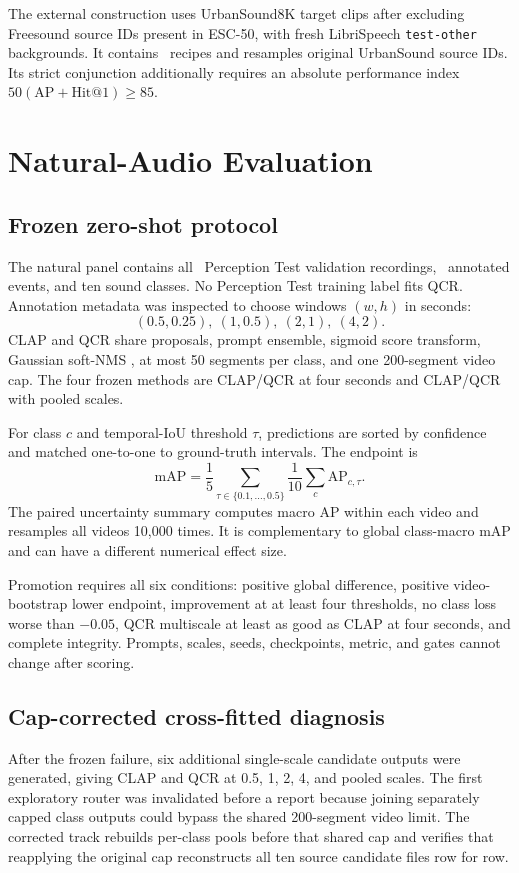 \documentclass[journal,10pt]{IEEEtran}
\begin{document}
The external construction uses UrbanSound8K target clips after excluding
Freesound source IDs present in ESC-50, with fresh LibriSpeech
\texttt{test-other} backgrounds. It contains \ExternalN\ recipes and resamples
original UrbanSound source IDs. Its strict conjunction additionally requires
an absolute performance index $50(\mathrm{AP}+\mathrm{Hit@1})\ge85$.

\section{Natural-Audio Evaluation}
\subsection{Frozen zero-shot protocol}
The natural panel contains all \NaturalVideos\ Perception Test validation
recordings, \NaturalEvents\ annotated events, and ten sound classes. No
Perception Test training label fits QCR. Annotation metadata was inspected to
choose windows $(w,h)$ in seconds:
\[
(0.5,0.25),\ (1,0.5),\ (2,1),\ (4,2).
\]
CLAP and QCR share proposals, prompt ensemble, sigmoid score transform,
Gaussian soft-NMS \cite{softnms}, at most 50 segments per class, and one
200-segment video cap. The four frozen methods are CLAP/QCR at four seconds
and CLAP/QCR with pooled scales.

For class $c$ and temporal-IoU threshold $\tau$, predictions are sorted by
confidence and matched one-to-one to ground-truth intervals. The endpoint is
\begin{equation}
\mathrm{mAP}=\frac1{5}\sum_{\tau\in\{0.1,\ldots,0.5\}}
\frac1{10}\sum_c\mathrm{AP}_{c,\tau}.
\end{equation}
The paired uncertainty summary computes macro AP within each video and
resamples all videos 10,000 times. It is complementary to global class-macro
mAP and can have a different numerical effect size.

Promotion requires all six conditions: positive global difference, positive
video-bootstrap lower endpoint, improvement at at least four thresholds, no
class loss worse than $-0.05$, QCR multiscale at least as good as CLAP at four
seconds, and complete integrity. Prompts, scales, seeds, checkpoints, metric,
and gates cannot change after scoring.

\subsection{Cap-corrected cross-fitted diagnosis}
After the frozen failure, six additional single-scale candidate outputs were
generated, giving CLAP and QCR at 0.5, 1, 2, 4, and pooled scales. The first
exploratory router was invalidated before a report because joining separately
capped class outputs could bypass the shared 200-segment video limit. The
corrected track rebuilds per-class pools before that shared cap and verifies
that reapplying the original cap reconstructs all ten source candidate files
row for row.
\end{document}

